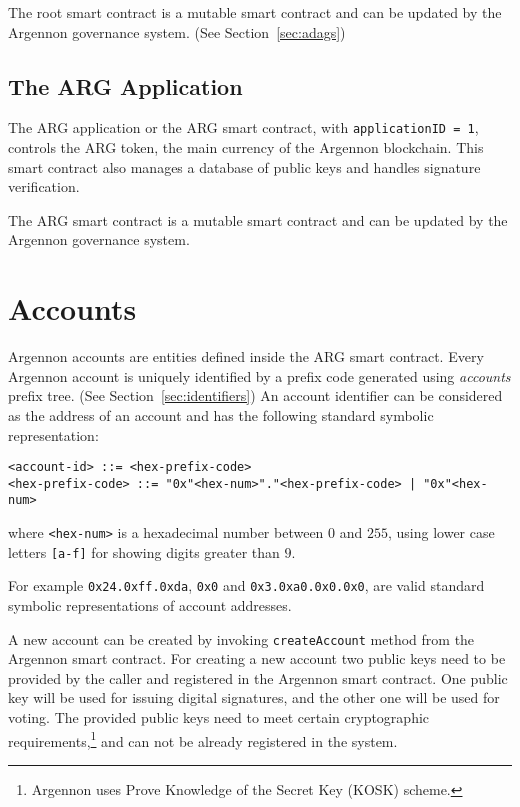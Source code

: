 The root smart contract is a mutable smart contract and can be updated by the Argennon governance system.
(See Section~\ref{sec:adags})

\subsection{The ARG Application}\label{subsec:the-arg-app}

The ARG application or the ARG smart contract,
with \texttt{applicationID = 1}, controls the ARG token, the main
currency of the Argennon blockchain. This smart contract also manages a database of public keys and
handles signature verification.

The ARG smart contract is a mutable smart contract and can be updated by the Argennon governance system.


\section{Accounts}\label{sec:accounts}

Argennon accounts are entities defined inside the ARG smart contract.
Every Argennon account is uniquely identified by a prefix code generated using \emph{accounts} prefix
tree. (See Section~\ref{sec:identifiers}) An account
identifier can be considered as the address of an account and has the following standard symbolic representation:
\begin{verbatim}
<account-id> ::= <hex-prefix-code>
<hex-prefix-code> ::= "0x"<hex-num>"."<hex-prefix-code> | "0x"<hex-num>
\end{verbatim}
where \texttt{<hex-num>} is a hexadecimal number between $0$ and $255$, using lower case
letters \texttt{[a-f]} for showing digits greater than $9$.

For example \texttt{0x24.0xff.0xda}, \texttt{0x0} and \texttt{0x3.0xa0.0x0.0x0}, are valid standard symbolic
representations of account addresses.

A new account can be created by invoking \texttt{createAccount} method from the Argennon smart contract. For creating
a new account two public keys need to be provided by the caller and registered in the Argennon smart contract.
One public key will be used for issuing digital signatures, and the other one will be used for voting. The
provided public keys need to meet certain cryptographic requirements,\footnote{Argennon uses Prove
Knowledge of the Secret Key (KOSK) scheme.} and can not be already registered in the system.

